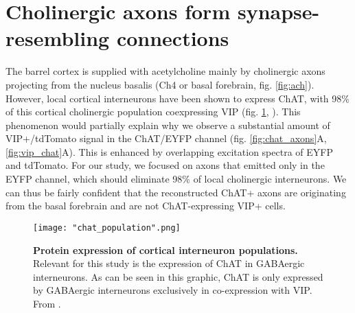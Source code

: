 \section{Cholinergic axons form synapse-resembling connections}
\label{sec:ach_axons}
The barrel cortex is supplied with acetylcholine mainly by cholinergic axons projecting from the nucleus basalis (Ch4 or basal forebrain, fig. \ref{fig:ach}). However, local cortical interneurons have been shown to express ChAT, with 98\% of this cortical cholinergic population coexpressing VIP (fig. \ref{fig:chat_population}, \cite{Gonchar2008}). This phenomenon would partially explain why we observe a substantial amount of VIP+/tdTomato signal in the ChAT/EYFP channel (fig. \ref{fig:chat_axons}A, \ref{fig:vip_chat}A). This is enhanced by overlapping excitation spectra of EYFP and tdTomato. For our study, we focused on axons that emitted only in the EYFP channel, which should eliminate 98\% of local cholinergic interneurons. We can thus be fairly confident that the reconstructed ChAT+ axons are originating from the basal forebrain and are not ChAT-expressing VIP+ cells.
\begin{figure}
	\captionsetup[figure]{indentation=0pt}
	\texttt{[image: "chat\_population".png]}
	\caption{\textbf{Protein expression of cortical interneuron populations.} Relevant for this study is the expression of ChAT in GABAergic interneurons. As can be seen in this graphic, ChAT is only expressed by GABAergic interneurons exclusively in co-expression with VIP. From \cite{Gonchar2008}.}
	\label{fig:chat_population}
\end{figure}
